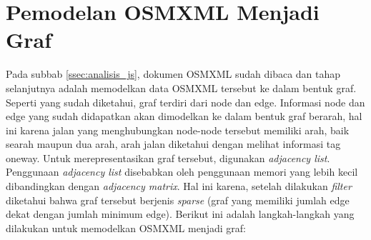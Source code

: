 \section{Pemodelan OSMXML Menjadi Graf} \label{ssec:analisis_graf}
Pada subbab \ref{ssec:analisis_js}, dokumen OSMXML sudah dibaca dan tahap
selanjutnya adalah memodelkan data OSMXML tersebut ke dalam bentuk graf. Seperti
yang sudah diketahui, graf terdiri dari node dan edge. Informasi node dan edge
yang sudah didapatkan akan dimodelkan ke dalam bentuk graf berarah, hal ini
karena jalan yang menghubungkan node-node tersebut memiliki arah, baik searah
maupun dua arah, arah jalan diketahui dengan melihat informasi tag oneway. Untuk
merepresentasikan graf tersebut, digunakan \textit{adjacency list}.
Penggunaan \textit{adjacency list} disebabkan oleh penggunaan memori yang lebih
kecil dibandingkan dengan \textit{adjacency matrix}. Hal ini karena, setelah
dilakukan \textit{filter} diketahui bahwa graf tersebut berjenis
\textit{sparse} (graf yang memiliki jumlah edge dekat dengan jumlah minimum
edge). Berikut ini adalah langkah-langkah yang dilakukan untuk memodelkan OSMXML
menjadi graf:
